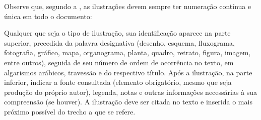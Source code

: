 Observe que, segundo a , as ilustrações devem sempre ter numeração contínua e única em todo o documento:

\begin{citacao}
   Qualquer que seja o tipo de ilustração, sua identificação aparece na parte superior, precedida da palavra designativa (desenho, esquema, fluxograma, fotografia, gráfico, mapa, organograma, planta, quadro, retrato, figura, imagem, entre outros), seguida de seu número de ordem de ocorrência no texto, em algarismos arábicos, travessão e do respectivo título. Após a ilustração, na parte inferior, indicar a fonte consultada (elemento obrigatório, mesmo que seja produção do próprio autor), legenda, notas e outras informações necessárias à sua compreensão (se houver). A ilustração deve ser citada no texto e inserida o mais próximo possível do trecho a que se refere. \cite[seções 5.8]{NBR14724:2011}
\end{citacao}